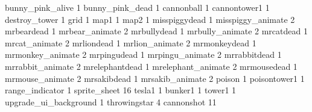 bunny_pink_alive 1
bunny_pink_dead 1
cannonball 1
cannontower1 1
destroy_tower 1
grid 1
map1 1
map2 1
misspiggydead 1
misspiggy_animate 2
mrbeardead 1
mrbear_animate 2
mrbullydead 1
mrbully_animate 2
mrcatdead 1
mrcat_animate 2
mrliondead 1
mrlion_animate 2
mrmonkeydead 1
mrmonkey_animate 2
mrpingudead 1
mrpingu_animate 2
mrrabbitdead 1
mrrabbit_animate 2
mrelephantdead 1
mrelephant_animate 2
mrmousedead 1
mrmouse_animate 2
mrsakibdead 1
mrsakib_animate 2
poison 1
poisontower1 1
range_indicator 1
sprite_sheet 16
tesla1 1
bunker1 1
tower1 1
upgrade_ui_background 1
throwingstar 4
cannonshot 11
